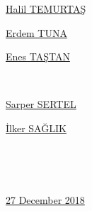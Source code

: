 \documentclass[a4paper,12pt]{article}
\begin{document}
		\vspace{1cm}
		
		
		\begin{minipage}[b]{0.33\linewidth}
			\centering
			\underline{Halil TEMURTAŞ}
		\end{minipage}%
		\begin{minipage}[b]{0.33\linewidth}
			\centering
			\underline{Erdem TUNA}
		\end{minipage}%
		\begin{minipage}[b]{0.33\linewidth}
			\centering
			\underline{Enes TAŞTAN}
		\end{minipage} \\[2.5cm]
		
		\begin{minipage}[b]{0.495\linewidth}
			\centering
			\underline{Sarper SERTEL}
		\end{minipage}%
		\begin{minipage}[b]{0.495\linewidth}
			\centering
			\underline{İlker SAĞLIK}
		\end{minipage}\\[2.5cm]
		
		\begin{minipage}[b]{0.745\linewidth}
			\centering
			~~
		\end{minipage}%
		\begin{minipage}[b]{0.25\linewidth}
			\centering
			\underline{27 December 2018}
		\end{minipage}

\newpage

\begin{appendices}
	
		
		

	
\end{appendices}




	
	
	
\end{document}
